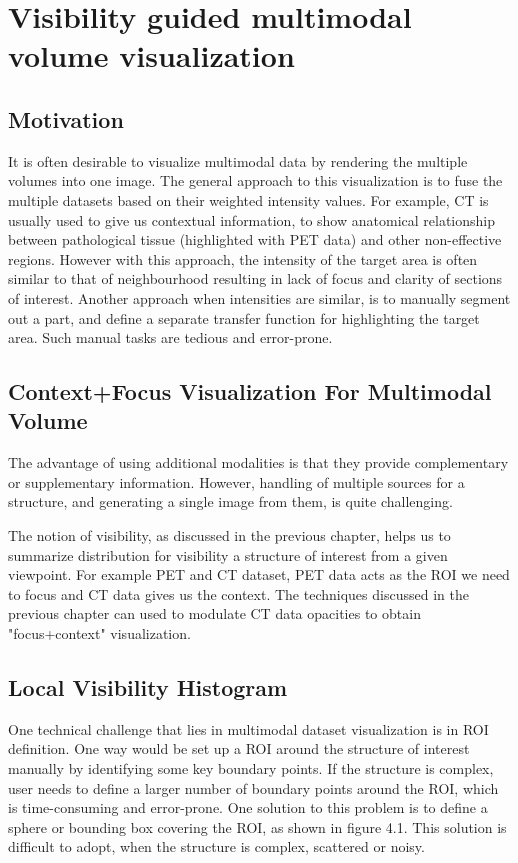 

\chapter{Visibility guided multimodal volume visualization }\label{chap:errors}


\section{Motivation }

It is often desirable to visualize multimodal data by rendering the multiple volumes into one image. The general approach to this visualization is to fuse the multiple datasets based on their weighted intensity values. For example, CT is usually used to give us contextual information, to show anatomical relationship between pathological tissue (highlighted with PET data) and other non-effective regions. However with this approach, the intensity of the target area is often similar to that of neighbourhood resulting in lack of focus and clarity of sections of interest.  Another approach when intensities are similar, is to manually segment out a part, and define a separate transfer function for highlighting the target area. Such manual tasks are tedious and error-prone.  

\section{Context+Focus Visualization For Multimodal Volume}

The advantage of using additional modalities is that they provide complementary or supplementary information. However, handling of multiple sources for a structure, and generating a single image from them, is quite challenging.  
 
The notion of visibility, as discussed in the previous chapter, helps us to summarize distribution for visibility a structure of interest from a given viewpoint. For example PET and CT dataset, PET data acts as the ROI we need to focus and CT data gives us the context. The techniques discussed in the previous chapter can used to modulate CT data opacities to obtain "focus+context" visualization. 

\section{Local Visibility Histogram}

One technical challenge that lies in multimodal dataset visualization is in ROI definition. One way would be set up a ROI around the structure of interest manually by identifying some key boundary points. If the structure is complex, user needs to define a larger number of boundary points around the ROI, which is time-consuming and error-prone. One solution to this problem is to define a sphere or bounding box covering the ROI, as shown in figure 4.1. This solution is difficult to adopt, when the structure is complex, scattered or noisy. 


